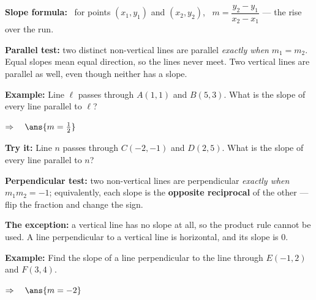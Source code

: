 \documentclass[12pt]{article}
\begin{document}


\begin{formulabox}
\textbf{Slope formula:} \ for points $(x_1, y_1)$ and $(x_2, y_2)$, \ $m = \dfrac{y_2 - y_1}{x_2 - x_1}$ --- the rise over the run.\par
\textbf{Parallel test:} two distinct non-vertical lines are parallel \emph{exactly when} $m_1 = m_2$. Equal slopes mean equal direction, so the lines never meet. Two vertical lines are parallel as well, even though neither has a slope.
\end{formulabox}

\begin{examplebox}
\textbf{Example:} \quad Line $\ell$ passes through $A(1, 1)$ and $B(5, 3)$. What is the slope of every line parallel to $\ell$?


$\Rightarrow\quad \ans{m = \tfrac{1}{2}}$
\end{examplebox}

\begin{tryitbox}
\textbf{Try it:} \quad Line $n$ passes through $C(-2, -1)$ and $D(2, 5)$. What is the slope of every line parallel to $n$?\\[2pt]
\end{tryitbox}


\begin{formulabox}
\textbf{Perpendicular test:} two non-vertical lines are perpendicular \emph{exactly when} $m_1 m_2 = -1$; equivalently, each slope is the \textbf{opposite reciprocal} of the other --- flip the fraction and change the sign.\par
\textbf{The exception:} a vertical line has no slope at all, so the product rule cannot be used. A line perpendicular to a vertical line is horizontal, and its slope is $0$.
\end{formulabox}

\begin{examplebox}
\textbf{Example:} \quad Find the slope of a line perpendicular to the line through $E(-1, 2)$ and $F(3, 4)$.


$\Rightarrow\quad \ans{m = -2}$
\end{examplebox}
\end{document}
